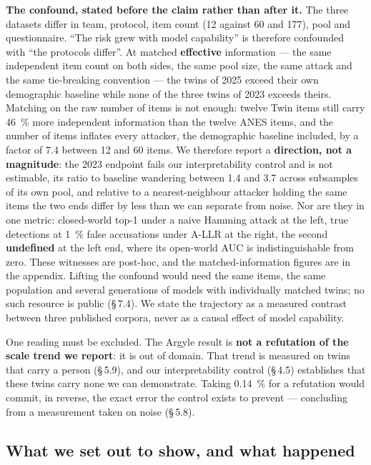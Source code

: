 \documentclass[sigconf,anonymous,review]{acmart}
\begin{document}
\textbf{The confound, stated before the claim rather than after it.} The three datasets differ in team, protocol, item count (12 against 60 and 177), pool and questionnaire. ``The risk grew with model capability'' is therefore confounded with ``the protocols differ''. At matched \textbf{effective} information --- the same independent item count on both sides, the same pool size, the same attack and the same tie-breaking convention --- the twins of 2025 exceed their own demographic baseline while none of the three twins of 2023 exceeds theirs. Matching on the raw number of items is not enough: twelve Twin items still carry 46~\% more independent information than the twelve ANES items, and the number of items inflates every attacker, the demographic baseline included, by a factor of 7.4 between 12 and 60 items. We therefore report a \textbf{direction, not a magnitude}: the 2023 endpoint fails our interpretability control and is not estimable, its ratio to baseline wandering between 1.4 and 3.7 across subsamples of its own pool, and relative to a nearest-neighbour attacker holding the same items the two ends differ by less than we can separate from noise. Nor are they in one metric: closed-world top-1 under a naive Hamming attack at the left, true detections at 1~\% false accusations under A-LLR at the right, the second \textbf{undefined} at the left end, where its open-world AUC is indistinguishable from zero. These witnesses are post-hoc, and the matched-information figures are in the appendix. Lifting the confound would need the same items, the same population and several generations of models with individually matched twins; no such resource is public (\S\,7.4). We state the trajectory as a measured contrast between three published corpora, never as a causal effect of model capability.

One reading must be excluded. The Argyle result is \textbf{not a refutation of the scale trend we report}: it is out of domain. That trend is measured on twins that carry a person (\S\,5.9), and our interpretability control (\S\,4.5) establishes that these twins carry none we can demonstrate. Taking 0.14~\% for a refutation would commit, in reverse, the exact error the control exists to prevent --- concluding from a measurement taken on noise (\S\,5.8).

\subsection{What we set out to show, and what happened}
\end{document}

